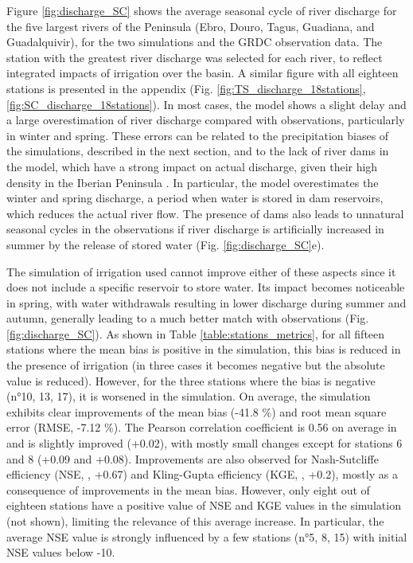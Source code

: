 Figure \ref{fig:discharge_SC} shows the average seasonal cycle of river discharge for the five largest rivers of the Peninsula (Ebro, Douro, Tagus, Guadiana, and Guadalquivir), for the two simulations and the GRDC observation data. The station with the greatest river discharge was selected for each river, to reflect integrated impacts of irrigation over the basin. A similar figure with all eighteen stations is presented in the appendix (Fig. \ref{fig:TS_discharge_18stations}, \ref{fig:SC_discharge_18stations}).
In most cases, the model shows a slight delay and a large overestimation of river discharge compared with observations, particularly in winter and spring. These errors can be related to the precipitation biases of the simulations, described in the next section, and to the lack of river dams in the model, which have a strong impact on actual discharge, given their high density in the Iberian Peninsula \citep[Fig. \ref{fig:selected_stations}, ][]{sabater_chapter_2022, moran-tejeda_reservoir_2012, lobera_geomorphic_2015}. In particular, the model overestimates the winter and spring discharge, a period when water is stored in dam reservoirs, which reduces the actual river flow.
The presence of dams also leads to unnatural seasonal cycles in the observations if river discharge is artificially increased in summer by the release of stored water (Fig. \ref{fig:discharge_SC}e).

The simulation of irrigation used cannot improve either of these aspects since it does not include a specific reservoir to store water. Its impact becomes noticeable in spring, with water withdrawals resulting in lower discharge during summer and autumn, generally leading to a much better match with observations (Fig. \ref{fig:discharge_SC}). 
As shown in Table \ref{table:stations_metrics}, for all fifteen stations where the mean bias is positive in the \noirr simulation, this bias is reduced in the presence of irrigation (in three cases it becomes negative but the absolute value is reduced). However, for the three stations where the \noirr bias is negative (n°10, 13, 17), it is worsened in the \irr simulation. On average, the \irr simulation exhibits clear improvements of the mean bias (-41.8 \%) and root mean square error (RMSE, -7.12 \%). The Pearson correlation coefficient is 0.56 on average in \noirr and is slightly improved (+0.02), with mostly small changes except for stations 6 and 8 (+0.09 and +0.08). Improvements are also observed for Nash-Sutcliffe efficiency (NSE, \citet{nash_river_1970}, +0.67) and Kling-Gupta efficiency (KGE, \citet{gupta_decomposition_2009}, +0.2), mostly as a consequence of improvements in the mean bias. However, only eight out of eighteen stations have a positive value of NSE and KGE values in the \noirr simulation (not shown), limiting the relevance of this average increase. In particular, the average NSE value is strongly influenced by a few stations (n°5, 8, 15) with initial NSE values below -10.

